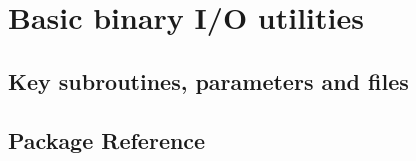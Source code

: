 \section{Basic binary I/O utilities}
\label{sec:rw}
\subsection{Key subroutines, parameters and files}
\label{sec:pkg:rw:implementation_synopsis}
\subsection{Package Reference}
